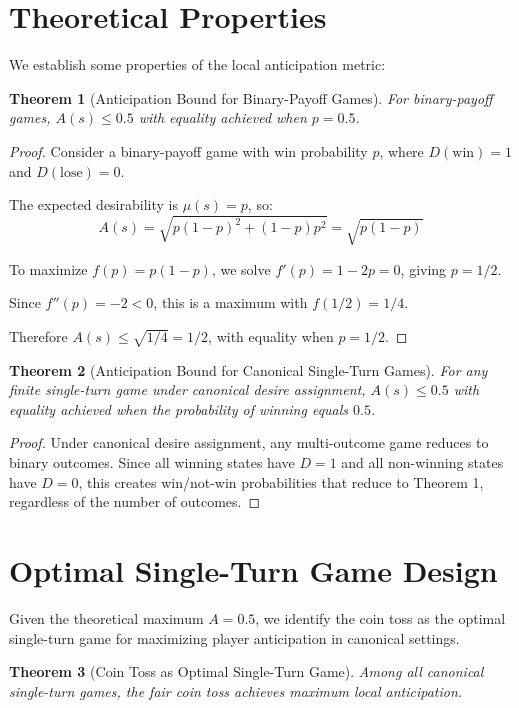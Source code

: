 \documentclass{article}
\newtheorem{theorem}{Theorem}
\begin{document}
\section{Theoretical Properties}

We establish some properties of the local anticipation metric:

\begin{theorem}[Anticipation Bound for Binary-Payoff Games]
For binary-payoff games, $A(s) \leq 0.5$ with equality achieved when $p = 0.5$.
\end{theorem}

\begin{proof}
Consider a binary-payoff game with win probability $p$, where $D(\text{win}) = 1$ and $D(\text{lose}) = 0$.

The expected desirability is $\mu(s) = p$, so:
\[
A(s) = \sqrt{p(1-p)^2 + (1-p)p^2} = \sqrt{p(1-p)}
\]

To maximize $f(p) = p(1-p)$, we solve $f'(p) = 1-2p = 0$, giving $p = 1/2$.

Since $f''(p) = -2 < 0$, this is a maximum with $f(1/2) = 1/4$.

Therefore $A(s) \leq \sqrt{1/4} = 1/2$, with equality when $p = 1/2$.
\end{proof}

\begin{theorem}[Anticipation Bound for Canonical Single-Turn Games]
For any finite single-turn game under canonical desire assignment, $A(s) \leq 0.5$ with equality achieved when the probability of winning equals $0.5$.
\end{theorem}

\begin{proof}
Under canonical desire assignment, any multi-outcome game reduces to binary outcomes. Since all winning states have $D = 1$ and all non-winning states have $D = 0$, this creates win/not-win probabilities that reduce to Theorem 1, regardless of the number of outcomes.
\end{proof}

\section{Optimal Single-Turn Game Design}

Given the theoretical maximum $A = 0.5$, we identify the coin toss as the optimal single-turn game for maximizing player anticipation in canonical settings.

\begin{theorem}[Coin Toss as Optimal Single-Turn Game]
Among all canonical single-turn games, the fair coin toss achieves maximum local anticipation.
\end{theorem}
\end{document}
